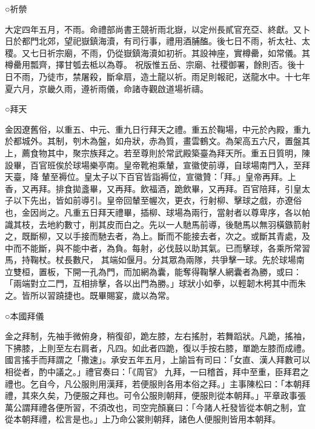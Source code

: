 \begin{pinyinscope}
 ○祈禜



 大定四年五月，不雨。命禮部尚書王競祈雨北嶽，以定州長貳官充亞、終獻。又卜日於都門北郊，望祀嶽鎮海瀆，有司行事，禮用酒脯醢。後七日不雨，祈太社、太稷。又七日祈宗廟，不雨，仍從嶽鎮海瀆如初祈。其設神座，實樽罍，如常儀。其樽罍用瓢齊，擇甘瓠去柢以為尊。
 祝版惟五岳、宗廟、社稷御署，餘則否。後十日不雨，乃徒市，禁屠殺，斷傘扇，造土龍以祈。雨足則報祀，送龍水中。十七年夏六月，京畿久雨，遵祈雨儀，命諸寺觀啟道場祈禱。



 ○拜天



 金因遼舊俗，以重五、中元、重九日行拜天之禮。重五於鞠場，中元於內殿，重九於都城外。其制，刳木為盤，如舟狀，赤為質，畫雲鶴文。為架高五六尺，置盤其上，薦食物其中，聚宗族拜之。若至尊則於常武殿築臺為拜天所。重五日質明，陳設畢，百官班俟於球場樂亭南。皇帝靴袍乘輦，宣徽使前導，自球場南門入，至拜天臺，降
 輦至褥位。皇太子以下百官皆詣褥位，宣徽贊：「拜。」皇帝再拜。上香，又再拜。排食拋盞畢，又再拜。飲福酒，跪飲畢，又再拜。百官陪拜，引皇太子以下先出，皆如前導引。皇帝回輦至幄次，更衣，行射柳、擊球之戲，亦遼俗也，金因尚之。凡重五日拜天禮畢，插柳、球場為兩行，當射者以尊卑序，各以帕識其枝，去地約數寸，削其皮而白之。先以一人馳馬前導，後馳馬以無羽橫鏃箭射之，既斷柳，又以手接而馳去者，為上。斷而不能接去者，次之。或斷其青處，及中而不能斷，與不能中者，為負。每射，必伐鼓以助其氣。已而擊球，各乘所常習馬，持鞠杖。杖長數尺，
 其端如偃月。分其眾為兩隊，共爭擊一球。先於球場南立雙桓，置板，下開一孔為門，而加網為囊，能奪得鞠擊人網囊者為勝，或曰：「兩端對立二門，互相排擊，各以出門為勝。」球狀小如拳，以輕韌木枵其中而朱之。皆所以習蹺捷也。既畢賜宴，歲以為常。



 ○本國拜儀



 金之拜制，先袖手微俯身，稍復卻，跪左膝，左右搖肘，若舞蹈狀。凡跪，搖袖，下拂膝，上則至左右肩者，凡四。如此者四跪，復以手按右膝，單跪左膝而成禮。國言搖手而拜謂之「撒速」。承安五年五月，上諭旨有司曰：「女直、漢人拜數可以相從者，酌中議之。」禮官奏曰：「《周官》
 九拜，一曰稽首，拜中至重，臣拜君之禮也。乞自今，凡公服則用漢拜，若便服則各用本俗之拜。」主事陳松曰：「本朝拜禮，其來久矣，乃便服之拜也。可令公服則朝拜，便服則從本朝拜。」平章政事張萬公謂拜禮各便所習，不須改也，司空完顏襄曰：「今諸人衽發皆從本朝之制，宜從本朝拜禮，松言是也。」上乃命公裳則朝拜，諸色人便服則皆用本朝拜。



\end{pinyinscope}
